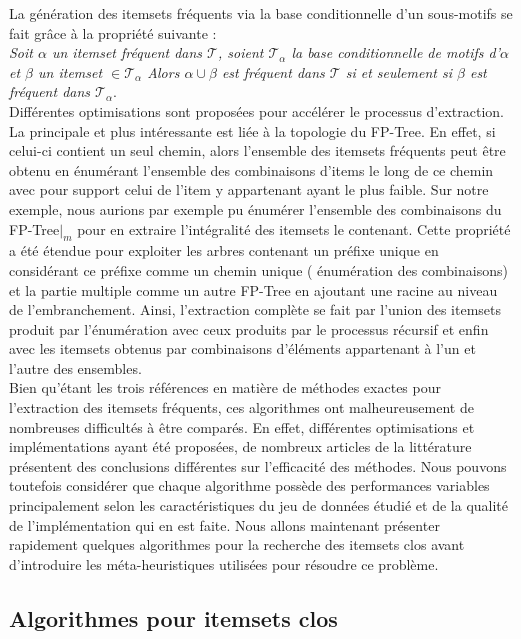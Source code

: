\documentclass[a4paper,10pt]{report}
\begin{document}
La génération des itemsets fréquents via la base conditionnelle d'un sous-motifs se fait grâce à la propriété suivante : \\

\emph{Soit $\alpha$ un itemset fréquent dans $\mathcal{T}$, soient $\mathcal{T}_{\alpha}$ la base conditionnelle de motifs d'$\alpha$ et $\beta$ un itemset $\in \mathcal{T}_{\alpha}$ Alors $\alpha \cup \beta$ est fréquent dans $\mathcal{T}$ si et seulement si $\beta$ est fréquent dans $\mathcal{T}_{\alpha}$}. \\

Différentes optimisations sont proposées pour accélérer le processus d'extraction. La principale et plus intéressante est liée à la topologie du FP-Tree. En effet, si celui-ci contient un seul chemin, alors l'ensemble des itemsets fréquents peut être obtenu en énumérant l'ensemble des combinaisons d'items le long de ce chemin avec pour support celui de l'item y appartenant ayant le plus faible. Sur notre exemple, nous aurions par exemple pu énumérer l'ensemble des combinaisons du FP-Tree$|_{m}$ pour en extraire l'intégralité des itemsets le contenant. Cette propriété a été étendue pour exploiter les arbres contenant un préfixe unique en considérant ce préfixe comme un chemin unique ( énumération des combinaisons) et la partie multiple comme un autre FP-Tree en ajoutant une racine au niveau de l'embranchement. Ainsi, l'extraction complète se fait par l'union des itemsets produit par l'énumération avec ceux produits par le processus récursif et enfin avec les itemsets obtenus par combinaisons d'éléments appartenant à l'un et l'autre des ensembles. \\

Bien qu'étant les trois références en matière de méthodes exactes pour l'extraction des itemsets fréquents, ces algorithmes ont malheureusement de nombreuses difficultés à être comparés. En effet, différentes optimisations et implémentations ayant été proposées, de nombreux articles de la littérature présentent des conclusions différentes sur l'efficacité des méthodes. Nous pouvons toutefois considérer que chaque algorithme possède des performances variables principalement selon les caractéristiques du jeu de données étudié et de la qualité de l'implémentation qui en est faite. Nous allons maintenant présenter rapidement quelques algorithmes pour la recherche des itemsets clos avant d'introduire les méta-heuristiques utilisées pour résoudre ce problème.

\subsection{Algorithmes pour itemsets clos}
\end{document}
